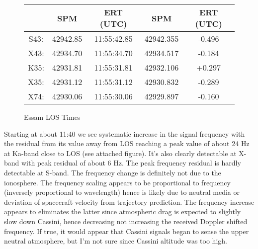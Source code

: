 \documentclass[crop=false,class=article,oneside]{standalone}
\begin{document}
        \begin{figure}
            \centering
            \captionsetup{type=table}
            \centering
            \caption{Essam LOS Times}
            \begin{tabular}{|c c c| c c|}
                \hline
                &SPM&ERT (UTC)&SPM&ERT (UTC)\\ 
                \hline
                S43:&42942.85&11:55:42.85&42942.355&-0.496\\
                X43:&42934.70&11:55:34.70&42934.517&-0.184\\
                K35:&42931.81&11:55:31.81&42932.106&+0.297\\
                X35:&42931.12&11:55:31.12&42930.832&-0.289\\
                X74:&42930.06&11:55:30.06&42929.897&-0.160\\
                \hline
            \end{tabular}
        \end{figure}
Starting at about 11:40 we see systematic increase in the signal frequency with the residual from its value away from LOS reaching a peak value of about 24 Hz at Ka-band close to LOS (see attached figure).  It's also clearly detectable at X-band with peak residual of about 6 Hz. The peak frequency residual is hardly detectable at S-band. The frequency change is definitely not due to the ionosphere. The frequency scaling appears to be proportional to frequency (inversely proportional to wavelength) hence is likely due to neutral media or deviation of spacecraft velocity from trajectory prediction.  The frequency increase appears to eliminates the latter since atmospheric drag is expected to slightly slow down Cassini, hence decreasing not increasing the received Doppler shifted frequency. If true, it would appear that Cassini signals began to sense the upper neutral atmosphere, but I'm not sure since Cassini altitude was too high.
\end{document}
